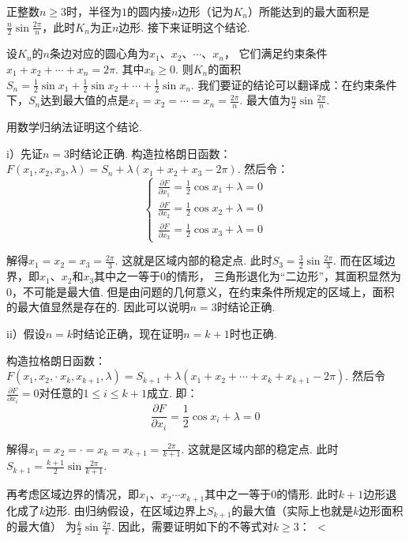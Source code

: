 \begin{solution}
正整数$n \ge 3$时，半径为$1$的圆内接$n$边形（记为$K_n$）所能达到的最大面积是
$\frac{n}{2} \sin \frac{2\pi}{n}$，此时$K_n$为正$n$边形.
接下来证明这个结论.\par

设$K_n$的$n$条边对应的圆心角为$x_1$、$x_2$、$\cdots$、$x_n$，
它们满足约束条件$x_1 + x_2 + \cdots + x_n = 2\pi$.
其中$x_k \ge 0$.
则$K_n$的面积$S_n = \frac{1}{2}\sin x_1 + \frac{1}{2}\sin x_2 + \cdots + \frac{1}{2}\sin x_n$.
我们要证的结论可以翻译成：在约束条件下，$S_n$达到最大值的点是$x_1 = x_2 = \cdots = x_n = \frac{2\pi}{n}$.
最大值为$\frac{n}{2} \sin \frac{2\pi}{n}$.
\par
用数学归纳法证明这个结论.\par
i）先证$n=3$时结论正确.
构造拉格朗日函数：$F(x_1,x_2,x_3,\lambda) = S_n + \lambda (x_1 + x_2 + x_3 -2\pi)$.
然后令：
\[
\begin{cases}
    \frac{\partial F}{\partial x_1} = \frac{1}{2} \cos x_1 + \lambda =0 \\
    \frac{\partial F}{\partial x_2} = \frac{1}{2} \cos x_2 + \lambda =0\\
    \frac{\partial F}{\partial x_3} = \frac{1}{2} \cos x_3 + \lambda =0
\end{cases}
\]\par
解得$x_1 = x_2 = x_3 = \frac{2\pi}{3}$.
这就是区域内部的稳定点.
此时$S_3 = \frac{3}{2} \sin \frac{2\pi}{3}$.
而在区域边界，即$x_1$、$x_2$和$x_3$其中之一等于$0$的情形，
三角形退化为“二边形”，其面积显然为$0$，不可能是最大值.
但是由问题的几何意义，在约束条件所规定的区域上，面积的最大值显然是存在的.
因此可以说明$n=3$时结论正确.\par
ii）假设$n=k$时结论正确，现在证明$n=k+1$时也正确.\par
构造拉格朗日函数：$F(x_1,x_2,\cdot ~x_k,x_{k+1},\lambda) = S_{k+1} + \lambda (x_1+x_2+\cdots + x_k + x_{k+1} - 2\pi)$.
然后令$\frac{\partial F}{\partial x_i}=0$对任意的$1 \le i \le k+1$成立.
即：
$$
\frac{\partial F}{\partial x_i}= \frac{1}{2}\cos x_i + \lambda = 0
$$\par
解得$x_1 = x_2 =\cdot = x_k = x_{k+1} = \frac{2\pi}{k+1}$.
这就是区域内部的稳定点.
此时$S_{k+1} = \frac{k+1}{2} \sin \frac{2\pi}{k+1}$.\par
再考虑区域边界的情况，即$x_1$、$x_2\cdots $$x_{k+1}$其中之一等于$0$的情形.
此时$k+1$边形退化成了$k$边形.
由归纳假设，在区域边界上$S_{k+1}$的最大值（实际上也就是$k$边形面积的最大值）
为$\frac{k}{2}\sin \frac{2\pi}{k}$.
因此，需要证明如下的不等式对$k\ge 3$：
$$
\sin {} < \sin {}

\end{solution}
